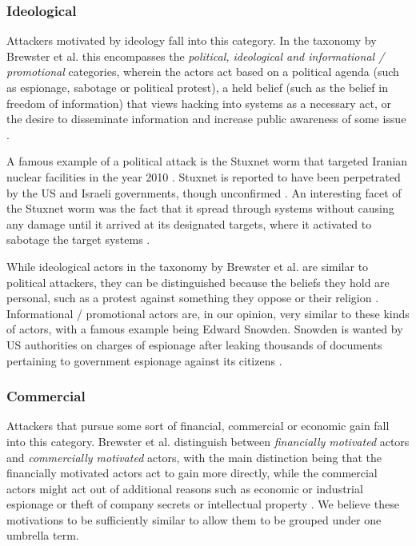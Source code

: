 \subsubsection{Ideological}
Attackers motivated by ideology fall into this category. In the taxonomy by Brewster et al. this encompasses the
\emph{political, ideological and informational / promotional} categories, wherein the actors act based on a political
agenda (such as espionage, sabotage or political protest), a held belief (such as the belief in freedom of information)
that views hacking into systems as a necessary act, or the desire to disseminate information and increase public
awareness of some issue \cite{brewster-malware-motivation}.

A famous example of a political attack is the Stuxnet worm that targeted Iranian nuclear facilities in the year
2010 \cite{brewster-malware-motivation}. Stuxnet is reported to have been perpetrated by the US and Israeli governments,
though unconfirmed \cite{beaumont-stuxnet}. 
An interesting facet of the Stuxnet worm was the fact that it spread through systems without causing any damage until it
arrived at its designated targets, where it activated to sabotage the target systems \cite{markoff-stuxnet}.

While ideological actors in the taxonomy by Brewster et al. are similar to political attackers, they can be
distinguished because the beliefs they hold are personal, such as a protest against something they oppose or their 
religion \cite{brewster-malware-motivation}. Informational / promotional actors are, in our opinion, very similar to
these kinds of actors, with a famous example being Edward Snowden. Snowden is wanted by US authorities on charges of
espionage after leaking thousands of documents pertaining to government espionage against its citizens \cite{snowden}.

\subsubsection{Commercial}
Attackers that pursue some sort of financial, commercial or economic gain fall into this category. Brewster et al.
distinguish between \emph{financially motivated} actors and \emph{commercially motivated} actors, with the main
distinction being that the financially motivated actors act to gain more directly, while the commercial actors might
act out of additional reasons such as economic or industrial espionage or theft of company secrets or intellectual
property \cite{brewster-malware-motivation}.
We believe these motivations to be sufficiently similar to allow them to be grouped under one umbrella term.

